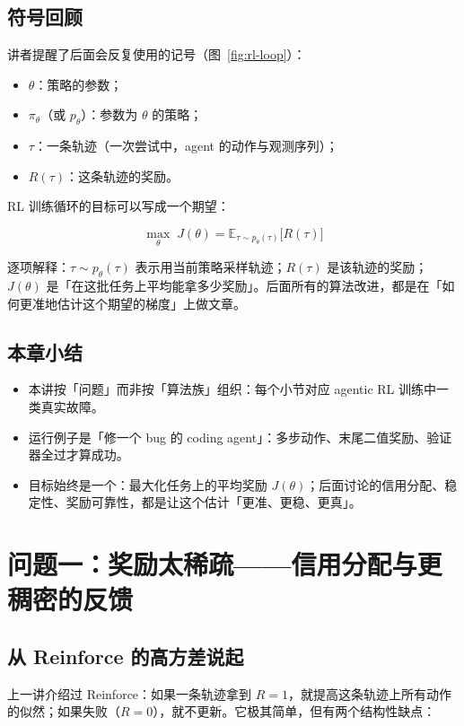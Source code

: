 \documentclass[a4paper]{article}
\begin{document}
\subsection{符号回顾}

讲者提醒了后面会反复使用的记号（图~\ref{fig:rl-loop}）：

\begin{itemize}
\item $\theta$：策略的参数；
\item $\pi_\theta$（或 $p_\theta$）：参数为 $\theta$ 的策略；
\item $\tau$：一条轨迹（一次尝试中，agent 的动作与观测序列）；
\item $R(\tau)$：这条轨迹的奖励。
\end{itemize}

RL 训练循环的目标可以写成一个期望：

$$\max_\theta \; J(\theta) = \mathbb{E}_{\tau \sim p_\theta(\tau)}\big[R(\tau)\big]$$

逐项解释：$\tau \sim p_\theta(\tau)$ 表示用当前策略采样轨迹；$R(\tau)$ 是该轨迹的奖励；$J(\theta)$ 是「在这批任务上平均能拿多少奖励」。后面所有的算法改进，都是在「如何更准地估计这个期望的梯度」上做文章。

\subsection{本章小结}

\begin{itemize}
\item 本讲按「问题」而非按「算法族」组织：每个小节对应 agentic RL 训练中一类真实故障。
\item 运行例子是「修一个 bug 的 coding agent」：多步动作、末尾二值奖励、验证器全过才算成功。
\item 目标始终是一个：最大化任务上的平均奖励 $J(\theta)$；后面讨论的信用分配、稳定性、奖励可靠性，都是让这个估计「更准、更稳、更真」。
\end{itemize}

\section{问题一：奖励太稀疏——信用分配与更稠密的反馈}

\subsection{从 Reinforce 的高方差说起}

上一讲介绍过 Reinforce：如果一条轨迹拿到 $R=1$，就提高这条轨迹上所有动作的似然；如果失败（$R=0$），就不更新。它极其简单，但有两个结构性缺点：
\end{document}
